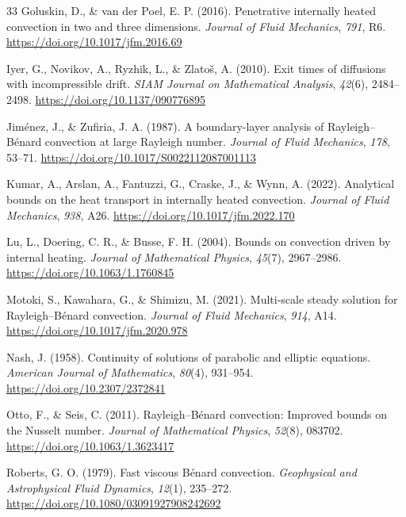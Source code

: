 \begin{thebibliography}{33}
Goluskin, D., \& van der Poel, E. P. (2016). Penetrative internally heated convection in two and three dimensions. \emph{Journal of Fluid Mechanics}, \emph{791}, R6. \url{https://doi.org/10.1017/jfm.2016.69}

Iyer, G., Novikov, A., Ryzhik, L., \& Zlatoš, A. (2010). Exit times of diffusions with incompressible drift. \emph{SIAM Journal on Mathematical Analysis}, \emph{42}(6), 2484--2498. \url{https://doi.org/10.1137/090776895}

Jiménez, J., \& Zufiria, J. A. (1987). A boundary-layer analysis of Rayleigh--Bénard convection at large Rayleigh number. \emph{Journal of Fluid Mechanics}, \emph{178}, 53--71. \url{https://doi.org/10.1017/S0022112087001113}

Kumar, A., Arslan, A., Fantuzzi, G., Craske, J., \& Wynn, A. (2022). Analytical bounds on the heat transport in internally heated convection. \emph{Journal of Fluid Mechanics}, \emph{938}, A26. \url{https://doi.org/10.1017/jfm.2022.170}

Lu, L., Doering, C. R., \& Busse, F. H. (2004). Bounds on convection driven by internal heating. \emph{Journal of Mathematical Physics}, \emph{45}(7), 2967--2986. \url{https://doi.org/10.1063/1.1760845}

Motoki, S., Kawahara, G., \& Shimizu, M. (2021). Multi-scale steady solution for Rayleigh--Bénard convection. \emph{Journal of Fluid Mechanics}, \emph{914}, A14. \url{https://doi.org/10.1017/jfm.2020.978}

Nash, J. (1958). Continuity of solutions of parabolic and elliptic equations. \emph{American Journal of Mathematics}, \emph{80}(4), 931--954. \url{https://doi.org/10.2307/2372841}

Otto, F., \& Seis, C. (2011). Rayleigh--Bénard convection: Improved bounds on the Nusselt number. \emph{Journal of Mathematical Physics}, \emph{52}(8), 083702. \url{https://doi.org/10.1063/1.3623417}

Roberts, G. O. (1979). Fast viscous Bénard convection. \emph{Geophysical and Astrophysical Fluid Dynamics}, \emph{12}(1), 235--272. \url{https://doi.org/10.1080/03091927908242692}


\end{thebibliography}
